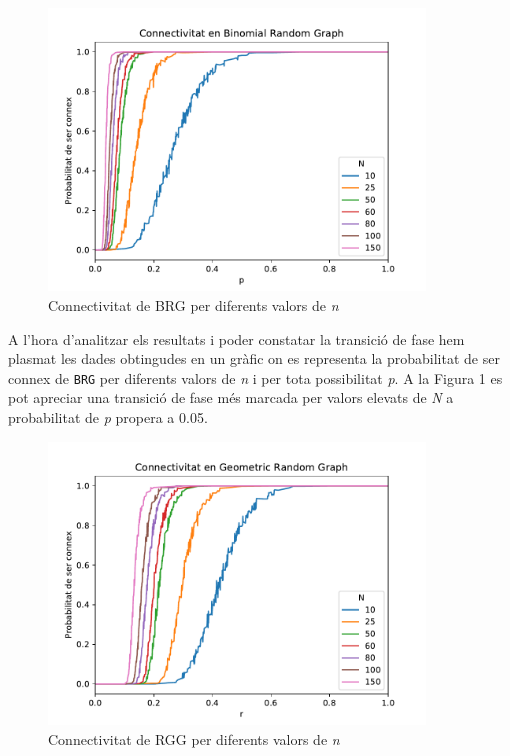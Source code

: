 

\begin{figure}[H]
    \centering
    \includegraphics[width=10cm]{plots/BRG_esConnex.pdf}
    \caption{Connectivitat de BRG per diferents valors de \textit{n}}
    \label{fig:connect_04}
\end{figure}

A l'hora d'analitzar els resultats i poder constatar la transició de fase hem plasmat les dades obtingudes en un gràfic on es representa la probabilitat de ser connex de \texttt{BRG} per diferents valors de \textit{n} i per tota possibilitat \textit{p}. A la Figura 1 es pot apreciar una transició de fase més marcada per valors elevats de \emph{N} a probabilitat de \textit{p} propera a 0.05.


\begin{figure}[H]
    \centering
    \includegraphics[width=10cm]{plots/GRG_esConnex.pdf}
    \caption{Connectivitat de RGG per diferents valors de \textit{n}}
    \label{fig:connect_04}
\end{figure}

